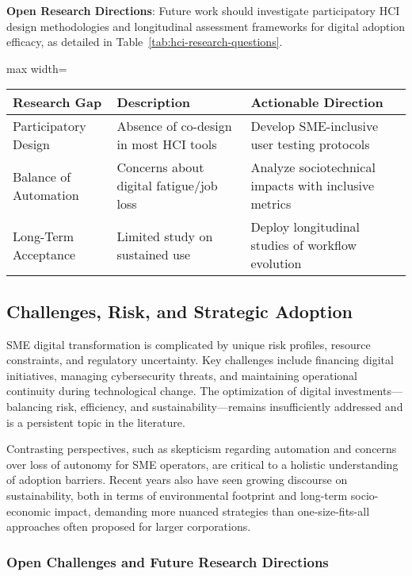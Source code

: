 \documentclass[sigconf]{acmart}
\begin{document}
\textbf{Open Research Directions}: Future work should investigate participatory HCI design methodologies and longitudinal assessment frameworks for digital adoption efficacy, as detailed in Table~\ref{tab:hci-research-questions}.

\begin{table*}[htbp]
\centering
\caption{Open Research Questions in HCI for SME Digital Transformation}
\label{tab:hci-research-questions}
\begin{adjustbox}{max width=\textwidth}
\begin{tabular}{@{}lll@{}}
\toprule
Research Gap & Description & Actionable Direction \\
\midrule
Participatory Design & Absence of co-design in most HCI tools & Develop SME-inclusive user testing protocols \\
Balance of Automation & Concerns about digital fatigue/job loss & Analyze sociotechnical impacts with inclusive metrics \\
Long-Term Acceptance & Limited study on sustained use & Deploy longitudinal studies of workflow evolution \\
\bottomrule
\end{tabular}
\end{adjustbox}
\end{table*}

\subsection{Challenges, Risk, and Strategic Adoption}

SME digital transformation is complicated by unique risk profiles, resource constraints, and regulatory uncertainty. Key challenges include financing digital initiatives, managing cybersecurity threats, and maintaining operational continuity during technological change. The optimization of digital investments—balancing risk, efficiency, and sustainability—remains insufficiently addressed and is a persistent topic in the literature.

Contrasting perspectives, such as skepticism regarding automation and concerns over loss of autonomy for SME operators, are critical to a holistic understanding of adoption barriers. Recent years also have seen growing discourse on sustainability, both in terms of environmental footprint and long-term socio-economic impact, demanding more nuanced strategies than one-size-fits-all approaches often proposed for larger corporations.

\subsubsection{Open Challenges and Future Research Directions}
\end{document}
